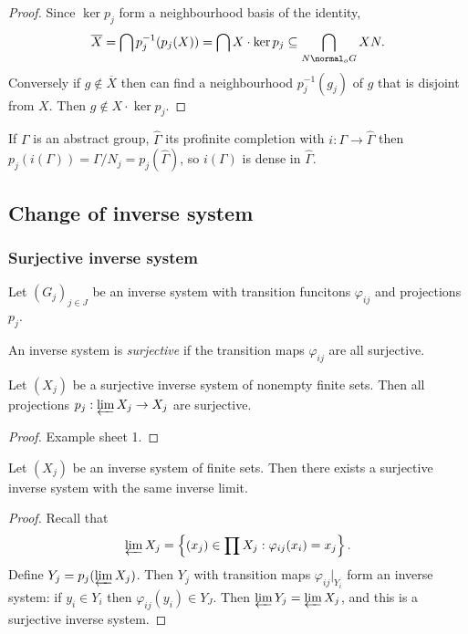 \documentclass[a4paper]{article}
\begin{document}
\begin{proof}
  Since \(\ker p_j\) form a neighbourhood basis of the identity,
  \[
    \overline X = \bigcap p_j^{-1}(p_j(X)) = \bigcap X \cdot \ker p_j \subseteq \bigcap_{N \normal_o G} XN.
  \]
  Conversely if \(g \notin \overline X\) then can find a neighbourhood \(p_j^{-1}(g_j)\) of \(g\) that is disjoint from \(X\). Then \(g \notin X \cdot \ker p_j\).
\end{proof}

\begin{eg}
  If \(\Gamma\) is an abstract group, \(\hat \Gamma\) its profinite completion with \(i: \Gamma \to \hat \Gamma\) then \(p_j(i(\Gamma)) = \Gamma/N_j = p_j(\hat \Gamma)\), so \(i(\Gamma)\) is dense in \(\hat \Gamma\).
\end{eg}

\subsection{Change of inverse system}

\subsubsection{Surjective inverse system}

Let \((G_j)_{j \in J}\) be an inverse system with transition funcitons \(\varphi_{ij}\) and projections \(p_j\).

\begin{definition}
  An inverse system is \emph{surjective} if the transition maps \(\varphi_{ij}\) are all surjective.
\end{definition}

\begin{proposition}
  Let \((X_j)\) be a surjective inverse system of nonempty finite sets. Then all projections \(p_j: \varprojlim X_j \to X_j\) are surjective.
\end{proposition}

\begin{proof}
  Example sheet 1.
\end{proof}

\begin{proposition}
  Let \((X_j)\) be an inverse system of finite sets. Then there exists a surjective inverse system with the same inverse limit.
\end{proposition}

\begin{proof}
  Recall that
  \[
    \varprojlim X_j = \left\{ (x_j) \in \prod X_j: \varphi_{ij}(x_i) = x_j \right\}.
  \]
  Define \(Y_j = p_j(\varprojlim X_j)\). Then \(Y_j\) with transition maps \(\varphi_{ij}|_{Y_i}\) form an inverse system: if \(y_i \in Y_i\) then \(\varphi_{ij}(y_i) \in Y_J\). Then \(\varprojlim Y_j = \varprojlim X_j\), and this is a surjective inverse system.
\end{proof}
\end{document}
